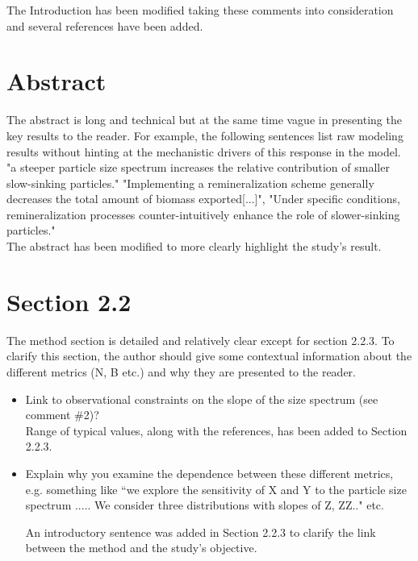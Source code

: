 \documentclass[12pt,letter]{article}
\begin{document}
{\color{blue} The Introduction has been modified taking these comments into consideration and several references have been added.}

\section*{Abstract}
The abstract is long and technical but at the same time vague in presenting the key results to the reader. For example, the following sentences list raw modeling results without hinting at the mechanistic drivers of this response in the model.
"a steeper particle size spectrum increases the relative contribution of smaller slow-sinking particles." "Implementing a remineralization scheme generally decreases the total amount of biomass exported[...]", "Under specific conditions, remineralization processes counter-intuitively enhance the role of slower-sinking particles."\\

{\color{blue}The abstract has been modified to more clearly highlight the study's result.\\}

\section*{Section 2.2}
The method section is detailed and relatively clear except for section 2.2.3. To clarify this section, the author should give some contextual information about the different metrics (N, B etc.) and why they are presented to the reader.
\begin{itemize}
	\item Link to observational constraints on the slope of the size spectrum (see comment \#2)?\\
	{\color{blue} Range of typical values, along with the references, has been added to Section 2.2.3.\\}

	\item Explain why you examine the dependence between these different metrics, e.g. something like ``we explore the sensitivity of X and Y to the particle size spectrum ..... We consider three distributions with slopes of Z, ZZ.." etc.
	
		{\color{blue} An introductory sentence was added in Section 2.2.3 to clarify the link between the method and the study's objective.\\}
\end{itemize}
\end{document}
